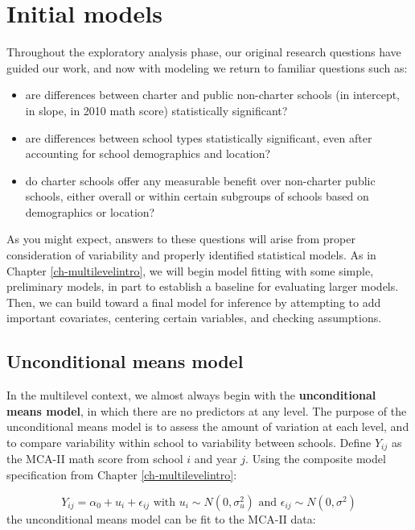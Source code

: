 \documentclass[
]{krantz}
\providecommand{\tightlist}{%
  \setlength{\itemsep}{0pt}\setlength{\parskip}{0pt}}
\begin{document}
\hypertarget{lineartwostageerror}{%
\section{Initial models}\label{lineartwostageerror}}

Throughout the exploratory analysis phase, our original research questions have guided our work, and now with modeling we return to familiar questions such as:

\begin{itemize}
\tightlist
\item
  are differences between charter and public non-charter schools (in intercept, in slope, in 2010 math score) statistically significant?
\item
  are differences between school types statistically significant, even after accounting for school demographics and location?
\item
  do charter schools offer any measurable benefit over non-charter public schools, either overall or within certain subgroups of schools based on demographics or location?
\end{itemize}

As you might expect, answers to these questions will arise from proper consideration of variability and properly identified statistical models.
As in Chapter \ref{ch-multilevelintro}, we will begin model fitting with some simple, preliminary models, in part to establish a baseline for evaluating larger models. Then, we can build toward a final model for inference by attempting to add important covariates, centering certain variables, and checking assumptions.

\hypertarget{modela}{%
\subsection{Unconditional means model}\label{modela}}

In the multilevel context, we almost always begin with the \textbf{unconditional means model}, in which there are no predictors at any level. The purpose of the unconditional means model is to assess the amount of variation at each level, and to compare variability within school to variability between schools. Define \(Y_{ij}\) as the MCA-II math score from school \(i\) and year \(j\). Using the composite model specification from Chapter \ref{ch-multilevelintro}:

\begin{equation}
Y _{ij} = \alpha_{0} + u_{i} + \epsilon_{ij} \textrm{ with } u_{i} \sim N(0, \sigma^2_u) \textrm{ and } \epsilon_{ij} \sim N(0, \sigma^2)
\end{equation}
the unconditional means model can be fit to the MCA-II data:
\end{document}
